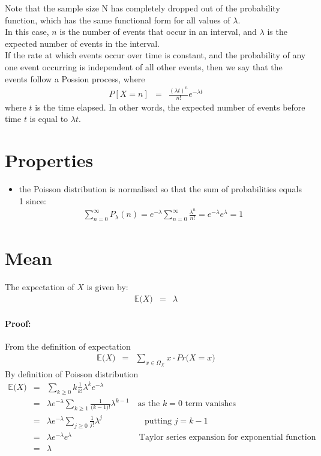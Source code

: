 Note that the sample size N has completely dropped out of the probability function, which has the same functional form for all values of $\lambda$.\\
In this case, $n$ is the number of events that occur in an interval, and $\lambda$ is the expected number of events in the interval.\\
If the rate at which events occur over time is constant, and the probability of any one event occurring is independent of all other events, then we say that the events follow a Possion process, where
\begin{eqnarray}
	P[X = n] &=& \frac{(\lambda t)^{n}}{n!}e^{-\lambda t}
\end{eqnarray}
where $t$ is the time elapsed. In other words, the expected number of events before time $t$ is equal to $\lambda t$.

\section{Properties}
\begin{itemize}
	\item the Poisson distribution is normalised so that the sum of probabilities equals 1 since:
	\begin{eqnarray}
		\sum_{n = 0}^{\infty}P_{\lambda}(n) = e^{-\lambda}\sum_{n = 0}^{\infty}\frac{\lambda^{n}}{n!} = e^{-\lambda}e^{\lambda} = 1
	\end{eqnarray}
\end{itemize}

\section{Mean}
The expectation of $X$ is given by:
\begin{eqnarray}
	\mathbb{E}\big(X\big) &=& \lambda
\end{eqnarray}

\paragraph{Proof:}
From the definition of expectation
\begin{eqnarray}
	\mathbb{E}\big(X\big) &=& \sum_{x \in\Omega_{X}}x\cdot Pr\big(X = x\big)
\end{eqnarray}
By definition of Poisson distribution
\begin{eqnarray}
	\nonumber
	\mathbb{E}\big(X\big) &=& \sum_{k \geq 0}k\frac{1}{k!}\lambda^{k}e^{-\lambda}\\
	\nonumber
	&=& \lambda e^{-\lambda} \sum_{k \geq 1}\frac{1}{\big(k - 1\big)!}\lambda^{k - 1} \quad\text{as the } k = 0 \text{ term vanishes}\\
	\nonumber
	&=& \lambda e^{-\lambda} \sum_{j \geq 0}\frac{1}{j!}\lambda^{j} \qquad\qquad\quad\text{putting } j = k - 1\\
	\nonumber
	&=& \lambda e^{-\lambda} e^{\lambda} \qquad\qquad\qquad\qquad\text{Taylor series expansion for exponential function}\\
	\nonumber
	&=& \lambda
\end{eqnarray}

